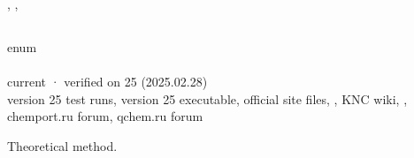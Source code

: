 \documentclass[letterpaper,10pt,english,openany,oneside]{sphinxmanual}
\begin{document}
\sphinxAtStartPar
{} {\hyperref[\detokenize{reference/optimize:optimize-saddle}]{}}, {\hyperref[\detokenize{reference/optimize:optimize-points}]{}}, {\hyperref[\detokenize{reference/control:control-print}]{}}


\subsection{}
\label{\detokenize{reference/control:theory}}\label{\detokenize{reference/control:control-theory}}
\ignorespaces 
\sphinxAtStartPar
{} enum\\
 \\
 current · verified on 25 (2025.02.28)\\
 version 25 test runs, version 25 executable, official site files, , KNC wiki, , chemport.ru forum, qchem.ru forum

\sphinxAtStartPar
Theoretical method.
\end{document}
